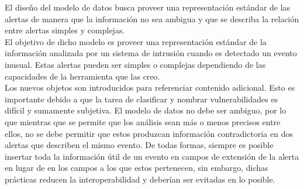 El diseño del modelo de datos busca proveer una representación estándar de las 
alertas de manera que la información no sea ambigua y que se describa la 
relación entre alertas simples y complejas.\\

El objetivo de dicho modelo es proveer una representación estándar de la 
información analizada por un sistema de intrusión cuando es detectado 
un evento inusual. Estas alertas pueden ser simples o complejas 
dependiendo de las capacidades de la herramienta que las creo.\\

Los nuevos objetos son introducidos para referenciar contenido adicional. Esto 
es importante debido a que la tarea de clasificar y nombrar vulnerabilidades es 
difícil y sumamente subjetiva. El modelo de datos no debe ser ambiguo, por lo 
que mientras que se permite que los análisis sean más o menos precisos 
entre ellos, no se debe permitir que estos produzcan información contradictoria  
en dos alertas que describen el mismo evento. De todas formas, siempre es 
posible insertar toda la información útil de un evento en campos de extensión 
de la alerta en lugar de en los campos a los que estos pertenecen, sin embargo, 
dichas prácticas reducen la interoperabilidad y deberían ser evitadas en lo 
posible.


